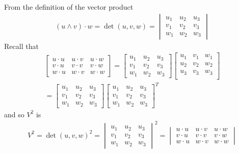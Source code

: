 \documentclass{article}
\begin{document}
	From the definition of the vector product
	\begin{gather*}
		(u \wedge v) \cdot w = \det(u, v, w) =
		\begin{vmatrix}
			u_1 & u_2 & u_3 \\
			v_1 & v_2 & v_3 \\
			w_1 & w_2 & w_3
		\end{vmatrix}
	\end{gather*}
	Recall that
	\begin{gather*}
		\begin{bmatrix}
			u \cdot u & u \cdot v & u \cdot w \\
			v \cdot u & v \cdot v & v \cdot w \\
			w \cdot u & w \cdot v & w \cdot w
		\end{bmatrix}
		=
		\begin{bmatrix}
			u_1 & u_2 & u_3 \\
			v_1 & v_2 & v_3 \\
			w_1 & w_2 & w_3
		\end{bmatrix}
		\begin{bmatrix}
			u_1 & v_1 & w_1 \\
			u_2 & v_2 & w_2 \\
			u_3 & v_3 & w_3 \\
		\end{bmatrix}
		\\ =
		\begin{bmatrix}
			u_1 & u_2 & u_3 \\
			v_1 & v_2 & v_3 \\
			w_1 & w_2 & w_3
		\end{bmatrix}
		\begin{bmatrix}
			u_1 & u_2 & u_3 \\
			v_1 & v_2 & v_3 \\
			w_1 & w_2 & w_3
		\end{bmatrix}^T
	\end{gather*}
	and so $V^2$ is
	\begin{gather*}
		V^2 = \det(u, v, w)^2 = 
		\begin{vmatrix}
			u_1 & u_2 & u_3 \\
			v_1 & v_2 & v_3 \\
			w_1 & w_2 & w_3
		\end{vmatrix}^2
		= 
		\begin{vmatrix}
			u \cdot u & u \cdot v & u \cdot w \\
			v \cdot u & v \cdot v & v \cdot w \\
			w \cdot u & w \cdot v & w \cdot w
		\end{vmatrix}
	\end{gather*}
	
\end{document}
